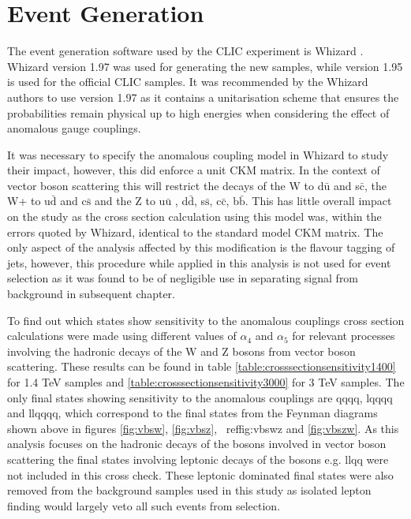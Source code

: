\fi

\section{Event Generation}
\label{sec:eventgenerationandbackgrounds}

The event generation software used by the CLIC experiment is Whizard \cite{0708.4233, hep-ph/0102195}. Whizard version 1.97 was used for generating the new samples, while version 1.95 is used for the official CLIC samples. It was recommended by the Whizard authors to use version 1.97 as it contains a unitarisation scheme that ensures the probabilities remain physical up to high energies when considering the effect of anomalous gauge couplings. 

It was necessary to specify the anomalous coupling model in Whizard to study their impact, however, this did enforce a unit CKM matrix. In the context of vector boson scattering this will restrict the decays of the W  to d$\bar{\text{u}}$ and s$\bar{\text{c}}$, the W+ to u$\bar{\text{d}}$ and c$\bar{\text{s}}$ and the Z to u$\bar{\text{u}}$ , d$\bar{\text{d}}$, s$\bar{\text{s}}$, c$\bar{\text{c}}$, b$\bar{\text{b}}$.  This has little overall impact on the study as the cross section calculation using this model was, within the errors quoted by Whizard, identical to the standard model CKM matrix.  The only aspect of the analysis affected by this modification is the flavour tagging of jets, however, this procedure while applied in this analysis is not used for event selection as it was found to be of negligible use in separating signal from background in subsequent chapter.

To find out which states show sensitivity to the anomalous couplings cross section calculations were made using different values of $\alpha_{4}$ and $\alpha_{5}$ for relevant processes involving the hadronic decays of the W and Z bosons from vector boson scattering.  These results can be found in table \ref{table:crosssectionsensitivity1400} for 1.4 TeV samples and \ref{table:crosssectionsensitivity3000} for 3 TeV samples.  The only final states showing sensitivity to the anomalous couplings are \nu{\nu}qqqq, l{\nu}qqqq and llqqqq, which correspond to the final states from the Feynman diagrams shown above in figures \ref{fig:vbsw}, \ref{fig:vbsz}, \ ref{fig:vbswz} and \ref{fig:vbszw}.  As this analysis focuses on the hadronic decays of the bosons involved in vector boson scattering the final states involving leptonic decays of the bosons e.g. \nu{\nu}llqq were not included in this cross check. These leptonic dominated final states were also removed from the background samples used in this study as isolated lepton finding would largely veto all such events from selection.


